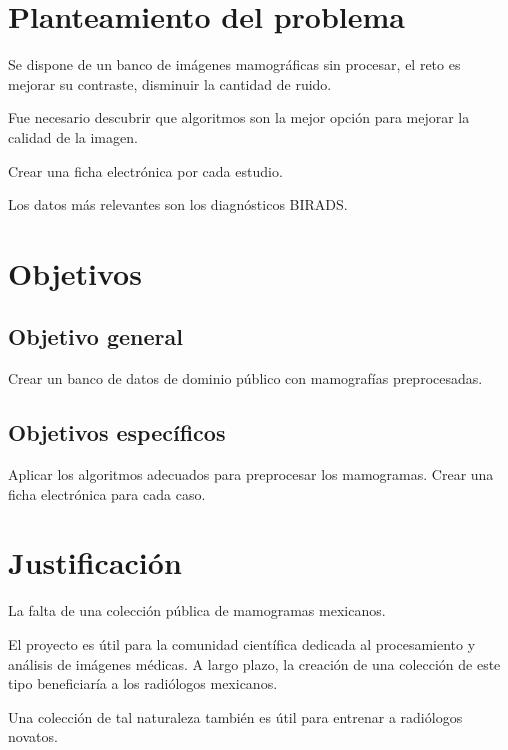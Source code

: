 \section{Planteamiento del problema}

Se dispone de un banco de imágenes mamográficas sin procesar, el reto es mejorar
su contraste, disminuir la cantidad de ruido.

Fue necesario descubrir que algoritmos son la mejor opción para mejorar la
calidad de la imagen.

Crear una ficha electrónica por cada estudio.

Los datos más relevantes son los diagnósticos BIRADS.

\section{Objetivos}

\subsection{Objetivo general}

Crear un banco de datos de dominio público con mamografías preprocesadas.

\subsection{Objetivos específicos}

Aplicar los algoritmos adecuados para preprocesar los mamogramas.
Crear una ficha electrónica para cada caso.

\section{Justificación}

La falta de una colección pública de mamogramas mexicanos.

El proyecto es útil para la comunidad científica dedicada al procesamiento y
análisis de imágenes médicas. A largo plazo, la creación de una colección de
este tipo beneficiaría a los radiólogos mexicanos.

Una colección de tal naturaleza también es útil para entrenar a radiólogos
novatos.
